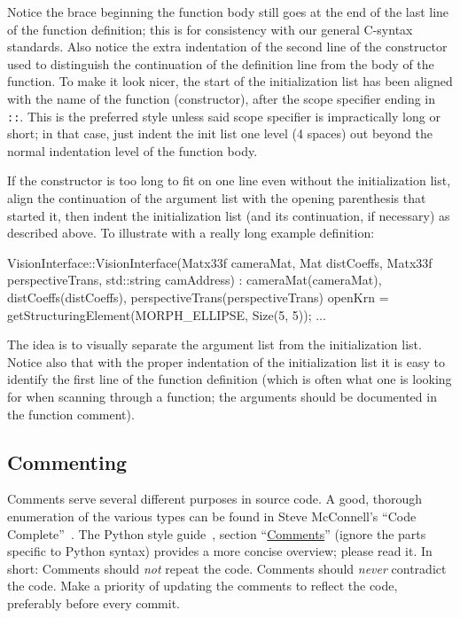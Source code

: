 \documentclass[12pt]{article}
\newcommand{\code}[1]{\texttt{#1}}
\begin{document}
Notice the brace beginning the function body still goes at the end of the last line of the function definition; this is for consistency with our general C-syntax standards. Also notice the extra indentation of the second line of the constructor used to distinguish the continuation of the definition line from the body of the function. To make it look nicer, the start of the initialization list has been aligned with the name of the function (constructor), after the scope specifier ending in \code{::}. This is the preferred style unless said scope specifier is impractically long or short; in that case, just indent the init list one level (4 spaces) out beyond the normal indentation level of the function body.

If the constructor is too long to fit on one line even without the initialization list, align the continuation of the argument list with the opening parenthesis that started it, then indent the initialization list (and its continuation, if necessary) as described above. To illustrate with a really long example definition:
\begin{codeex}
VisionInterface::VisionInterface(Matx33f cameraMat, Mat distCoeffs,
                                 Matx33f perspectiveTrans,
                                 std::string camAddress) :
                 cameraMat(cameraMat), distCoeffs(distCoeffs),
                 perspectiveTrans(perspectiveTrans) {
    openKrn = getStructuringElement(MORPH_ELLIPSE, Size(5, 5));
    ...
}
\end{codeex}

The idea is to visually separate the argument list from the initialization list. Notice also that with the proper indentation of the initialization list it is easy to identify the first line of the function definition (which is often what one is looking for when scanning through a function; the arguments should be documented in the function comment).
\subsection{Commenting}
Comments serve several different purposes in source code. A good, thorough enumeration of the various types can be found in Steve McConnell's ``Code Complete''~\cite{codecomplete}. The Python style guide~\cite{pyguide}, section ``\href{http://www.python.org/dev/peps/pep-0008/#comments}{Comments}'' (ignore the parts specific to Python syntax) provides a more concise overview; please read it. In short: Comments should \emph{not} repeat the code. Comments should \emph{never} contradict the code. Make a priority of updating the comments to reflect the code, preferably before every commit.
\end{document}
